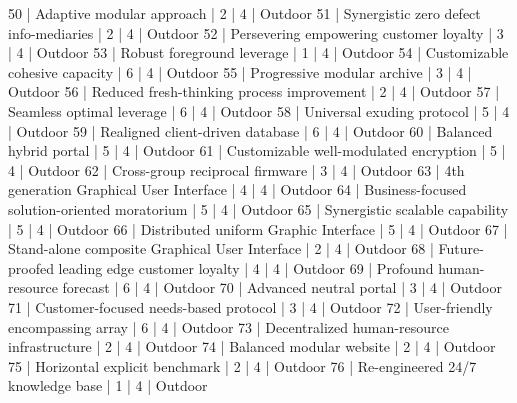 \begin{enumerate}
\begin{pseudo*}
      50 | Adaptive modular approach                        |        2 |      4 | Outdoor       
      51 | Synergistic zero defect info-mediaries           |        2 |      4 | Outdoor       
      52 | Persevering empowering customer loyalty          |        3 |      4 | Outdoor       
      53 | Robust foreground leverage                       |        1 |      4 | Outdoor       
      54 | Customizable cohesive capacity                   |        6 |      4 | Outdoor       
      55 | Progressive modular archive                      |        3 |      4 | Outdoor       
      56 | Reduced fresh-thinking process improvement       |        2 |      4 | Outdoor       
      57 | Seamless optimal leverage                        |        6 |      4 | Outdoor       
      58 | Universal exuding protocol                       |        5 |      4 | Outdoor       
      59 | Realigned client-driven database                 |        6 |      4 | Outdoor       
      60 | Balanced hybrid portal                           |        5 |      4 | Outdoor       
      61 | Customizable well-modulated encryption           |        5 |      4 | Outdoor       
      62 | Cross-group reciprocal firmware                  |        3 |      4 | Outdoor       
      63 | 4th generation Graphical User Interface          |        4 |      4 | Outdoor       
      64 | Business-focused solution-oriented moratorium    |        5 |      4 | Outdoor       
      65 | Synergistic scalable capability                  |        5 |      4 | Outdoor       
      66 | Distributed uniform Graphic Interface            |        5 |      4 | Outdoor       
      67 | Stand-alone composite Graphical User Interface   |        2 |      4 | Outdoor       
      68 | Future-proofed leading edge customer loyalty     |        4 |      4 | Outdoor       
      69 | Profound human-resource forecast                 |        6 |      4 | Outdoor       
      70 | Advanced neutral portal                          |        3 |      4 | Outdoor       
      71 | Customer-focused needs-based protocol            |        3 |      4 | Outdoor       
      72 | User-friendly encompassing array                 |        6 |      4 | Outdoor       
      73 | Decentralized human-resource infrastructure      |        2 |      4 | Outdoor       
      74 | Balanced modular website                         |        2 |      4 | Outdoor       
      75 | Horizontal explicit benchmark                    |        2 |      4 | Outdoor       
      76 | Re-engineered 24/7 knowledge base                |        1 |      4 | Outdoor       

\end{pseudo*}
\end{enumerate}

